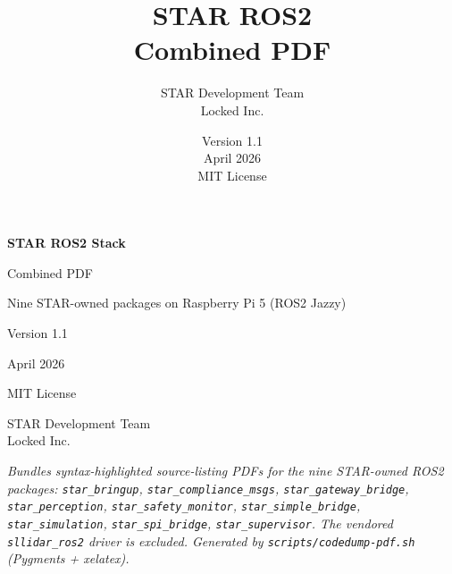 \documentclass[11pt,letterpaper]{article}
\title{\Huge\bfseries STAR ROS2\\[0.4em]\Large Combined PDF}
\author{STAR Development Team \\ Locked Inc.}
\date{Version 1.1 \\ April 2026 \\ MIT License}
\begin{document}
\begin{titlepage}
\centering
\vspace*{2.5cm}

{\Huge\bfseries STAR ROS2 Stack\par}
\vspace{0.3cm}
{\LARGE Combined PDF\par}
\vspace{0.3cm}
{\large Nine STAR-owned packages on Raspberry Pi 5 (ROS2 Jazzy)\par}

\vfill

{\large Version 1.1\par}
{\large April 2026\par}
\vspace{0.4cm}
{\large MIT License\par}

\vfill

{\normalsize STAR Development Team\\Locked Inc.\par}
\vspace{0.8cm}

{\small\itshape Bundles syntax-highlighted source-listing PDFs for the
nine STAR-owned ROS2 packages: \texttt{star\_bringup},
\texttt{star\_compliance\_msgs}, \texttt{star\_gateway\_bridge},
\texttt{star\_perception}, \texttt{star\_safety\_monitor},
\texttt{star\_simple\_bridge}, \texttt{star\_simulation},
\texttt{star\_spi\_bridge}, \texttt{star\_supervisor}.
The vendored \texttt{sllidar\_ros2} driver is excluded. Generated by
\texttt{scripts/codedump-pdf.sh} (Pygments + xelatex).\par}
\end{titlepage}

\tableofcontents
\newpage






\end{document}
